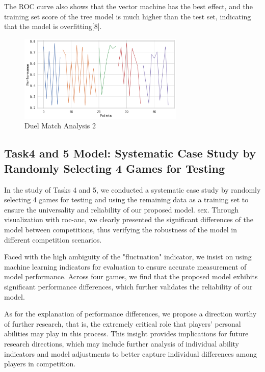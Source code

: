 \documentclass[12pt]{article}
\begin{document}
The ROC curve also shows that the vector machine has the best effect, and the training set score of the tree model is much higher than the test set, indicating that the model is overfitting[8].
\begin{figure}[H]
      \centering
      \includegraphics[width=0.7\textwidth]{duelMatch2.png}
      \caption{Duel Match Analysis 2}
\end{figure}

\subsection{Task4 and 5 Model: Systematic Case Study by Randomly Selecting 4 Games for Testing}
In the study of Tasks 4 and 5, we conducted a systematic case study by randomly selecting 4 games for testing and using the remaining data as a training set to ensure the universality and reliability
of our proposed model. sex. Through visualization with roc-auc, we clearly presented the significant differences of the model between competitions, thus verifying the robustness of the model in different competition scenarios.

Faced with the high ambiguity of the "fluctuation" indicator, we insist on using machine learning indicators for evaluation to ensure accurate measurement of model performance. Across four games, we find that the proposed model exhibits significant
performance differences, which further validates the reliability of our model.

As for the explanation of performance differences, we propose a direction worthy of further research, that is, the extremely critical role that players' personal abilities may play in this process. This insight provides implications for future research directions,
which may include further analysis of individual ability indicators and model adjustments to better capture individual differences among players in competition.
\end{document}
